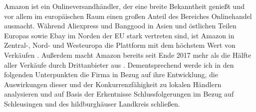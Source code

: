  Amazon ist ein Onlineversandhändler, der eine breite Bekanntheit genießt und vor allem im europäischen Raum einen großen Anteil des Bereiches Onlinehandel ausmacht. 
 Während Aliexpress und Banggood in Asien und östlichen Teilen Europas sowie Ebay im Norden der EU stark vertreten sind, ist Amazon in Zentral-, Nord- und Westeuropa die Plattform mit dem höchstem Wert von Verkäufen \cite[S. 22]{EuroCommerce}. Außerdem macht Amazon bereits seit Ende 2017 mehr als die Hälfte aller Verkäufe durch Drittanbieter aus \cite[S. 25]{Haendlerbund}. Dementsprechend werde ich in den folgenden Unterpunkten die Firma in Bezug auf ihre Entwicklung, die Auswirkungen dieser und der Konkurrenzfähigkeit zu lokalen Händlern analysieren und auf Basis der Erkentnisse Schlussfolgerungen im Bezug auf Schleusingen und des hildburghäuser Landkreis schließen.
